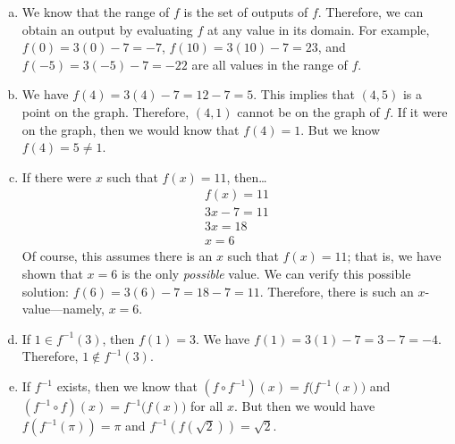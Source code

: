 \documentclass[11pt,letterpaper]{article}
\begin{document}
\sol 
\begin{enumerate}[(a)]
\item We know that the range of $f$ is the set of outputs of $f$. Therefore, we can obtain an output by evaluating $f$ at any value in its domain. For example, $f(0)= 3(0) - 7= -7$, $f(10)= 3(10) - 7= 23$, and $f(-5)= 3(-5) - 7= -22$ are all values in the range of $f$. \pspace

\item We have $f(4)= 3(4) - 7= 12 - 7= 5$. This implies that $(4, 5)$ is a point on the graph. Therefore, $(4, 1)$ cannot be on the graph of $f$. If it were on the graph, then we would know that $f(4)= 1$. But we know $f(4)= 5 \neq 1$. \pspace

\item If there were $x$ such that $f(x)= 11$, then\dots
	\[
	\begin{gathered}
	f(x)= 11 \\
	3x - 7= 11 \\
	3x= 18 \\
	x= 6
	\end{gathered}
	\]
Of course, this assumes there is an $x$ such that $f(x)= 11$; that is, we have shown that $x= 6$ is the only \textit{possible} value. We can verify this possible solution: $f(6)= 3(6) - 7= 18 - 7= 11$. Therefore, there is such an $x$-value---namely, $x= 6$. \pspace

\item If $1 \in f^{-1}(3)$, then $f(1)= 3$. We have $f(1)= 3(1) - 7= 3 - 7= -4$. Therefore, $1 \notin f^{-1}(3)$. \pspace

\item If $f^{-1}$ exists, then we know that $(f \circ f^{-1})(x)= f \big( f^{-1}(x) \big)$ and $(f^{-1} \circ f)(x)= f^{-1} \big( f(x) \big)$ for all $x$. But then we would have $f(f^{-1}(\pi))= \pi$ and $f^{-1}(f(\sqrt{2}))= \sqrt{2}$.
\end{enumerate}
\end{document}
